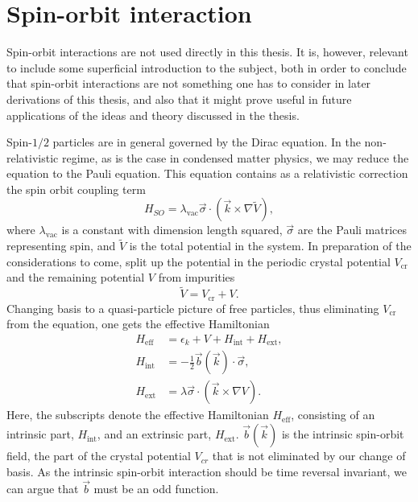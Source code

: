 \section{Spin-orbit interaction}
Spin-orbit interactions are not used directly in this thesis.
It is, however, relevant to include some superficial introduction to the subject, both in order to conclude that spin-orbit interactions are not something one has to consider in later derivations of this thesis, and also that it might prove useful in future applications of the ideas and theory discussed in the thesis.

Spin-$1 /2$ particles are in general governed by the Dirac equation.
In the non-relativistic regime, as is the case in condensed matter physics, we may reduce the equation to the Pauli equation.
This equation contains as a relativistic correction the spin orbit coupling term~\cite{engelTheorySpinHall2007}
\begin{equation}
  \label{eq:pauli}
  H_{SO} = \lambda_{\text{vac}} \vec{\sigma} \cdot ( \vec{k} \times \nabla \tilde{V}),
\end{equation}
where $\lambda_{\text{vac}}$ is a constant with dimension length squared, $\vec{\sigma}$ are the Pauli matrices representing spin, and $\tilde{V}$ is the total potential in the system.
In preparation of the considerations to come, split up the potential in the periodic crystal potential $V_\text{cr}$ and the remaining potential $V$ from impurities
\begin{equation}
  \tilde{V} = V_{\text{cr}} + V.
\end{equation}
Changing basis to a quasi-particle picture of free particles, thus eliminating $V_\text{cr}$ from the equation, one gets the effective Hamiltonian~\cite{engelTheorySpinHall2007}
\begin{align}
  \label{eq:Heff}
  H_\text{eff} &= \epsilon_k + V + H_\text{int} + H_\text{ext},\\
  H_\text{int} &= -\frac12 \vec{b}(\vec{k}) \cdot \vec{\sigma},\\
  H_\text{ext} &= \lambda \vec{\sigma} \cdot( \vec{k} \times \nabla V).
\end{align}
Here, the subscripts denote the effective Hamiltonian $H_{\text{eff}}$, consisting of an intrinsic part, $H_{\text{int}}$, and an extrinsic part, $H_{\text{ext}}$.
$\vec{b}(\vec{k})$ is the intrinsic spin-orbit field, the part of the crystal potential $V_{cr}$ that is not eliminated by our change of basis.
As the intrinsic spin-orbit interaction should be time reversal invariant, we can argue that $\vec{b}$ must be an odd function.

